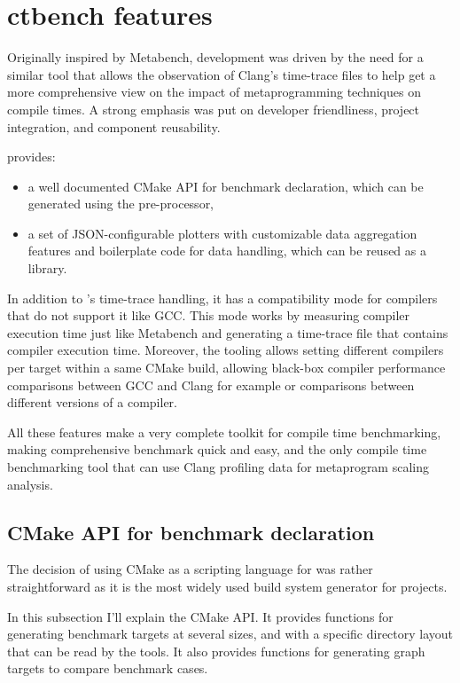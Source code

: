\documentclass[../../main.tex]{subfiles}
\begin{document}
\section{ctbench features}

Originally inspired by Metabench\cite{metabench}, \ctbench development was
driven by the need for a similar tool that allows the observation of Clang's
time-trace files to help get a more comprehensive view on the impact of
metaprogramming techniques on compile times. A strong emphasis was put on
developer friendliness, project integration, and component reusability.

\ctbench provides:

\begin{itemize}
\item a well documented CMake API for benchmark declaration, which can be
      generated using the \cpp pre-processor,
\item a set of JSON-configurable plotters with customizable data aggregation
      features and boilerplate code for data handling, which can be reused as a
      \cpp library.
\end{itemize}

In addition to \ctbench's time-trace handling, it has a compatibility mode
for compilers that do not support it like GCC. This mode works by measuring
compiler execution time just like Metabench\cite{metabench} and generating a
time-trace file that contains compiler execution time. Moreover, the tooling
allows setting different compilers per target within a same CMake build,
allowing black-box compiler performance comparisons between GCC and Clang for
example or comparisons between different versions of a compiler.

All these features make \ctbench a very complete toolkit for compile time
benchmarking, making comprehensive benchmark quick and easy, and the only
compile time benchmarking tool that can use Clang profiling data for metaprogram
scaling analysis.

\subsection{CMake API for benchmark declaration}
\label{lbl:ctbench-cmake-api}

The decision of using CMake as a scripting language for \ctbench was rather
straightforward as it is the most widely used build system generator for \cpp
projects.

In this subsection I'll explain the CMake API. It provides functions for
generating benchmark targets at several sizes, and with a specific directory
layout that can be read by the \grapher tools. It also provides functions for
generating graph targets to compare benchmark cases.
\end{document}
